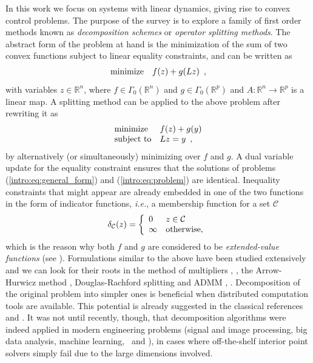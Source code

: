\documentclass[openany]{now}
\newcommand{\ie}{{\it i.e.}}
\newcommand{\reals}{{\mathbb R}}
\begin{document}
In this work we focus on systems with linear dynamics, giving rise to convex control problems. The purpose of the survey is to explore a family of first order methods known as \emph{decomposition schemes} or \emph{operator splitting methods}. The abstract form of the problem at hand is the minimization of the sum of two convex functions subject to linear equality constraints, and can be written as
    \begin{equation}{\label{intro:eq:problem}} 
    \begin{array}{ll}
      \mbox{minimize} & f(z) + g(Lz)\enspace,
    \end{array}
    \end{equation}
with variables $z\in\reals^n$, where $f\in\Gamma_0(\reals^n)$ and $g\in\Gamma_0(\reals^p)$ and $A:\reals^n\to\reals^p$ is a linear map. A splitting method can be applied to the above problem after rewriting it as 
  \begin{equation}{\label{intro:eq:general_form}} 
  \begin{array}{ll}
    \mbox{minimize} & f(z) + g(y) \\
    \mbox{subject to} & Lz  = y\enspace,
  \end{array}
  \end{equation}
 by alternatively (or simultaneously) minimizing over $f$ and $g$. A dual variable update for the equality constraint ensures that the solutions of problems (\ref{intro:eq:general_form}) and (\ref{intro:eq:problem}) are identical. Inequality constraints that might appear are already embedded in one of the two functions in the form of indicator functions, \ie, a membership function for a set $\mathcal{C}$
\begin{equation} {\label{eq:ind}}
\delta_{\mathcal{C}}(z) = \left\{ \begin{array}{ll} 0 & z\in \mathcal{C} \\
              \infty & \mbox{otherwise},
              \end{array} \right.
\end{equation}
which is the reason why both $f$ and $g$ are considered to be \emph{extended-value functions} (see \cite[Section~3.1.2]{cvxbook}).
Formulations similar to the above have been studied extensively and we can look for their roots in the method of multipliers \cite{Hestenes}, \cite{Powell}, the Arrow-Hurwicz method \cite{AH}, Douglas-Rachford splitting \cite{DR} and ADMM \cite{GloMar}, \cite{GaMe}. Decomposition of the original problem into simpler ones is beneficial when distributed computation tools are available. This potential is already suggested in the classical references \cite{Bertsekas_pdc} and \cite{Eckstein_dr}. It was not until recently, though, that decomposition algorithms were indeed applied in modern engineering problems (signal and image processing, big data analysis, machine learning,~\cite{admm_distr_stats} and \cite{combettes2011proximal}), in cases where off-the-shelf interior point solvers simply fail due to the large dimensions involved. 
\end{document}
